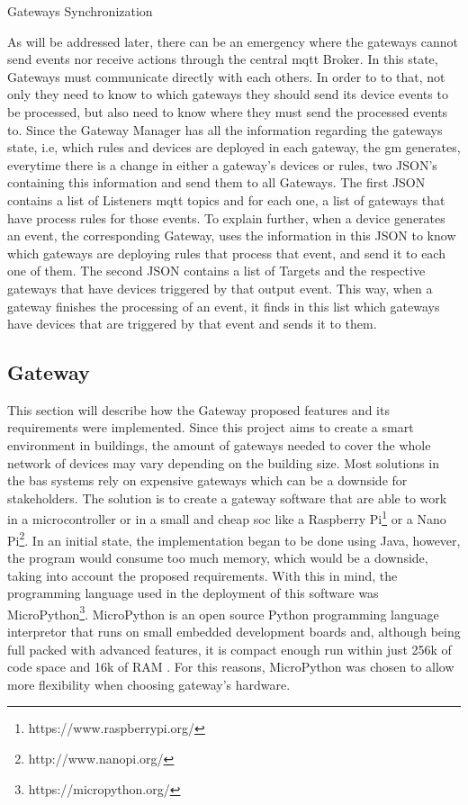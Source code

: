 \begin{Paragraph}{Gateways Synchronization}

As will be addressed later, there can be an emergency where the gateways cannot send events nor receive actions through the central \ac{mqtt} Broker. In this state, Gateways must communicate directly with each others. In order to to that, not only they need to know to which gateways they should send its device events to be processed, but also need to know where they must send the processed events to. Since the Gateway Manager has all the information regarding the gateways state, i.e, which rules and devices are deployed in each gateway, the \ac{gm} generates, everytime there is a change in either a gateway's devices or rules, two JSON's containing this information and send them to all Gateways. The first JSON contains a list of Listeners \ac{mqtt} topics and for each one, a list of gateways that have process rules for those events. To explain further, when a device generates an event, the corresponding Gateway, uses the information in this JSON to know which gateways are deploying rules that process that event, and send it to each one of them. The second JSON contains a list of Targets and the respective gateways that have devices triggered by that output event. This way, when a gateway finishes the processing of an event, it finds in this list which gateways have devices that are triggered by that event and sends it to them.
 
\end{Paragraph}


\subsection{Gateway}
\label{arch:gw}

This section will describe how the Gateway proposed features and its requirements were implemented. Since this project aims to create a smart environment in buildings, the amount of gateways needed to cover the whole network of devices may vary depending on the building size. Most solutions in the \ac{bas} systems rely on expensive gateways which can be a downside for stakeholders. The solution is to create a gateway software that are able to work in a microcontroller or in a small and cheap \ac{soc} like a Raspberry Pi\footnote{https://www.raspberrypi.org/} or a Nano Pi\footnote{http://www.nanopi.org/}. In an initial state, the implementation began to be done using Java, however, the program would consume too much memory, which would be a downside, taking into account the proposed requirements. With this in mind, the programming language used in the deployment of this software was MicroPython\footnote{https://micropython.org/}. MicroPython is an open source Python programming language interpretor that runs on small embedded development boards \cite{micro2} and, although being full packed with advanced features, it is compact enough run within just 256k of code space and 16k of RAM \cite{micro}. For this reasons, MicroPython was chosen to allow more flexibility when choosing gateway's hardware.

